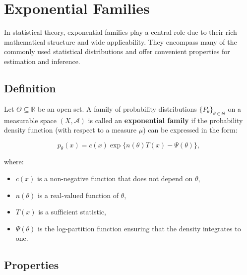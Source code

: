 \documentclass[open=any, 11pt,paper=A4]{scrreprt}
\begin{document}
\section{Exponential Families}

In statistical theory, exponential families play a central role due to their rich mathematical structure and wide applicability. They encompass many of the commonly used statistical distributions and offer convenient properties for estimation and inference.

\subsection{Definition}

Let $\Theta \subseteq \mathbb{R}$ be an open set. A family of probability distributions $\{P_\theta\}_{\theta \in \Theta}$ on a measurable space $(X, \mathcal{A})$ is called an \textbf{exponential family} if the probability density function (with respect to a measure $\mu$) can be expressed in the form:

\begin{equation}
p_\theta(x) = c(x) \exp\{ n(\theta) T(x) - \Psi(\theta) \},
\end{equation}

where:

\begin{itemize}
    \item $c(x)$ is a non-negative function that does not depend on $\theta$,
    \item $n(\theta)$ is a real-valued function of $\theta$,
    \item $T(x)$ is a sufficient statistic,
    \item $\Psi(\theta)$ is the log-partition function ensuring that the density integrates to one.
\end{itemize}

\subsection{Properties}
\end{document}

